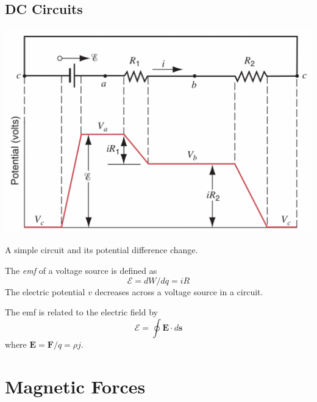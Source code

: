 \documentclass{tufte-book}
\renewcommand{\b}{\mathbf}
\begin{document}
\section{DC Circuits}
%
\begin{marginfigure}
  \includegraphics[width=1\textwidth]{dc}
  \caption{A simple circuit and its potential difference change.}
\end{marginfigure}
%
The \emph{emf} of a voltage source is defined as \begin{equation}
    \mathcal E = dW/dq = iR
\end{equation}
The electric potential $v$ decreases across a voltage source in a circuit.

\bigskip
\begin{center}
\end{center}
\bigskip

The emf is related to the electric field by \begin{equation}
    \mathcal E = \oint \b E \cdot d \b s
\end{equation}
where $\b E = \b F/q = \rho j$.


\chapter{Magnetic Forces}
\end{document}
